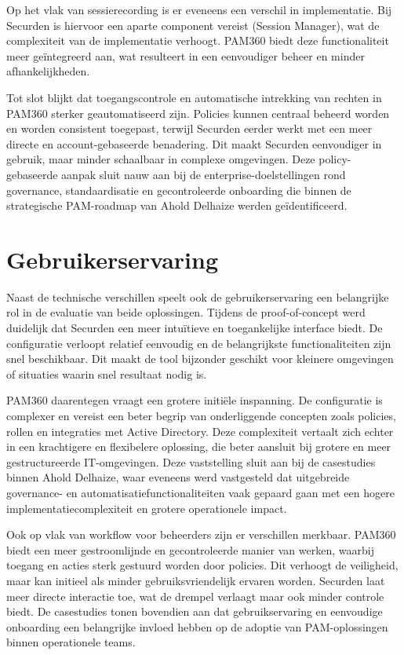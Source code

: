 Op het vlak van sessierecording is er eveneens een verschil in implementatie. Bij Securden is hiervoor een aparte component vereist (Session Manager), wat de complexiteit van de implementatie verhoogt. PAM360 biedt deze functionaliteit meer geïntegreerd aan, wat resulteert in een eenvoudiger beheer en minder afhankelijkheden.

Tot slot blijkt dat toegangscontrole en automatische intrekking van rechten in PAM360 sterker geautomatiseerd zijn. Policies kunnen centraal beheerd worden en worden consistent toegepast, terwijl Securden eerder werkt met een meer directe en account-gebaseerde benadering. Dit maakt Securden eenvoudiger in gebruik, maar minder schaalbaar in complexe omgevingen. Deze policy-gebaseerde aanpak sluit nauw aan bij de enterprise-doelstellingen rond governance, standaardisatie en gecontroleerde onboarding die binnen de strategische PAM-roadmap van Ahold Delhaize werden geïdentificeerd.
\section{Gebruikerservaring}
Naast de technische verschillen speelt ook de gebruikerservaring een belangrijke rol in de evaluatie van beide oplossingen. Tijdens de proof-of-concept werd duidelijk dat Securden een meer intuïtieve en toegankelijke interface biedt. De configuratie verloopt relatief eenvoudig en de belangrijkste functionaliteiten zijn snel beschikbaar. Dit maakt de tool bijzonder geschikt voor kleinere omgevingen of situaties waarin snel resultaat nodig is.

PAM360 daarentegen vraagt een grotere initiële inspanning. De configuratie is complexer en vereist een beter begrip van onderliggende concepten zoals policies, rollen en integraties met Active Directory. Deze complexiteit vertaalt zich echter in een krachtigere en flexibelere oplossing, die beter aansluit bij grotere en meer gestructureerde IT-omgevingen. Deze vaststelling sluit aan bij de casestudies binnen Ahold Delhaize, waar eveneens werd vastgesteld dat uitgebreide governance- en automatisatiefunctionaliteiten vaak gepaard gaan met een hogere implementatiecomplexiteit en grotere operationele impact.

Ook op vlak van workflow voor beheerders zijn er verschillen merkbaar. PAM360 biedt een meer gestroomlijnde en gecontroleerde manier van werken, waarbij toegang en acties sterk gestuurd worden door policies. Dit verhoogt de veiligheid, maar kan initieel als minder gebruiksvriendelijk ervaren worden. Securden laat meer directe interactie toe, wat de drempel verlaagt maar ook minder controle biedt. De casestudies tonen bovendien aan dat gebruikservaring en eenvoudige onboarding een belangrijke invloed hebben op de adoptie van PAM-oplossingen binnen operationele teams.

